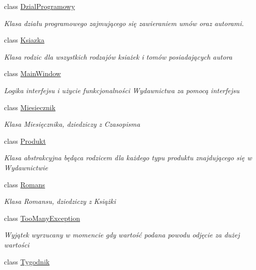 \begin{DoxyCompactItemize}
class \mbox{\hyperlink{class_projekt1_1_1_dzial_programowy}{Dzial\+Programowy}}
\begin{DoxyCompactList}\small\item\em Klasa działu programowego zajmującego się zawieraniem umów oraz autorami. \end{DoxyCompactList}\item 
class \mbox{\hyperlink{class_projekt1_1_1_ksiazka}{Ksiazka}}
\begin{DoxyCompactList}\small\item\em Klasa \textquotesingle{}rodzic\textquotesingle{} dla wszystkich rodzajów ksiażek i tomów posiadających autora \end{DoxyCompactList}\item 
class \mbox{\hyperlink{class_projekt1_1_1_main_window}{Main\+Window}}
\begin{DoxyCompactList}\small\item\em Logika interfejsu i użycie funkcjonalności Wydawnictwa za pomocą interfejsu \end{DoxyCompactList}\item 
class \mbox{\hyperlink{class_projekt1_1_1_miesiecznik}{Miesiecznik}}
\begin{DoxyCompactList}\small\item\em Klasa Miesięcznika, dziedziczy z Czasopisma \end{DoxyCompactList}\item 
class \mbox{\hyperlink{class_projekt1_1_1_produkt}{Produkt}}
\begin{DoxyCompactList}\small\item\em Klasa abstrakcyjna będąca rodzicem dla każdego typu produktu znajdującego się w Wydawnictwie \end{DoxyCompactList}\item 
class \mbox{\hyperlink{class_projekt1_1_1_romans}{Romans}}
\begin{DoxyCompactList}\small\item\em Klasa Romansu, dziedziczy z Książki \end{DoxyCompactList}\item 
class \mbox{\hyperlink{class_projekt1_1_1_too_many_exception}{Too\+Many\+Exception}}
\begin{DoxyCompactList}\small\item\em Wyjątek wyrzucany w momencie gdy wartość podana powodu odjęcie za dużej wartości \end{DoxyCompactList}\item 
class \mbox{\hyperlink{class_projekt1_1_1_tygodnik}{Tygodnik}}

\end{DoxyCompactItemize}
